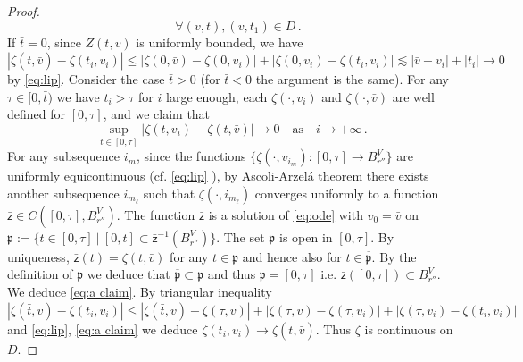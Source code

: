 \documentclass[11pt,a4paper,reqno]{article}
\numberwithin{equation}{section}
\theoremstyle{definition}
\begin{document}
\begin{appendix}
\begin{proof}
\begin{equation}
\quad \forall (v,t),(v,t_1)\in D\, .
        \end{equation}  
        If $\bar t=0$, since $Z(t,v)$ is uniformly bounded, we have $| \zeta(\bar t,\bar v)-\zeta(t_i, v_i)|\leq | \zeta(0,\bar v)-\zeta(0, v_i)| +| \zeta(0,v_i)-\zeta(t_i, v_i)|\lesssim |\bar v-v_i|+|t_i| \to 0$ by \eqref{eq:lip}. 
        Consider the case  $\bar t>0$ (for $ \bar t < 0 $ the argument is the same).
        For any $\tau\in [0,\bar t)$ we have $t_i>\tau$ for $ i  $ large enough, 
each 
        $\zeta(\cdot, v_i)$ and $\zeta(\cdot ,\bar v)$ are well defined for $ [0, \tau ]$, and 
        we claim that %
        \begin{equation}\label{eq:a claim}
            \sup_{t\in[0,\tau]}|\zeta (t,v_i) -\zeta(t,\bar v) |\to 0\quad \text{as}\quad i\to +\infty\, .
        \end{equation}   
        For any subsequence $i_m$, since  the functions $\{\zeta(\cdot,v_{i_m}):[0,\tau]\to B_{r''}^V\}$ are uniformly equicontinuous (cf. \eqref{eq:lip} ), by Ascoli-Arzel\'a theorem there exists another subsequence $i_{m_\ell} $ such that $\zeta(\cdot, {i_{m_\ell}})$ converges uniformly to a function $\bar {\mathsf{z}}\in C([0,\tau],\overline{B_{r''}^V})$.
        The function $\bar {\mathsf{z}} $ is a solution of \eqref{eq:ode} with $v_0=\bar v$ on 
        $\mathfrak{p}:=\{t\in [0,\tau] \ |  \ [0,t]\subset {\mathsf{\bar z}}^{-1}
        (B_{r''}^V) \}$. The set $\mathfrak{p}$ is open in $[0,\tau]$.
        By uniqueness, $  \mathsf{\bar z}(t)=\zeta(t , \bar v)$ for any $t\in \mathfrak{p}$ and hence also for $t\in \overline{\mathfrak{p}}$.
        By the definition  of $\mathfrak{p}$ we deduce that $\overline{\mathfrak{p}}\subset \mathfrak{p}$ and thus $\mathfrak{p}=[0,\tau]$ i.e. $\mathsf{\bar z}([0,\tau])\subset B_{r''}^V$.
        We deduce \eqref{eq:a claim}.    
By triangular inequality $
            |\zeta(\bar t,\bar v)-\zeta(t_i,v_i)|\leq
            |\zeta(\bar t,\bar v)-\zeta(\tau,\bar v)| + 
            |\zeta(\tau,\bar v)-\zeta(\tau,v_i)|+
            |\zeta(\tau,v_i)-\zeta(t_{i},v_i)|
        $
        and \eqref{eq:lip}, \eqref{eq:a claim} we deduce $\zeta(t_i,v_i)\to \zeta(\bar t,\bar v)$.
        Thus $\zeta$ is continuous on $D$.
        \end{proof}


\end{appendix}
\end{document}
